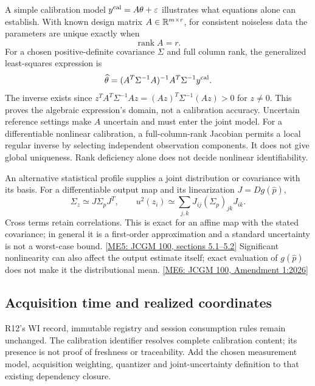 A simple calibration model $y^{\rm cal}=A\theta+\varepsilon$ illustrates what
equations alone can establish. With known design matrix $A\in\mathbb R^{m\times r}$,
for consistent noiseless data the parameters are unique exactly when
\begin{equation}
 \operatorname{rank}A=r.
 \label{r13-measurement-rank}
\end{equation}
For a chosen positive-definite covariance $\Sigma$ and full column rank,
the generalized least-squares expression is
\begin{equation}
 \widehat\theta=(A^T\Sigma^{-1}A)^{-1}A^T\Sigma^{-1}y^{\rm cal}.
 \label{r13-measurement-gls}
\end{equation}
The inverse exists since
$z^TA^T\Sigma^{-1}Az=(Az)^T\Sigma^{-1}(Az)>0$ for $z\ne0$.
This proves the algebraic expression's domain, not a calibration accuracy.
Uncertain reference settings make $A$ uncertain and must enter the joint
model. For a differentiable nonlinear calibration, a full-column-rank
Jacobian permits a local regular inverse by selecting independent observation
components. It does not give global uniqueness. Rank deficiency alone does
not decide nonlinear identifiability.

An alternative statistical profile supplies a joint distribution or covariance
with its basis. For a differentiable output map and its linearization
$J=Dg(\widehat p)$,
\begin{equation}
 \Sigma_z\simeq J\Sigma_pJ^T,\qquad
 u^2(z_i)\simeq\sum_{j,k}J_{ij}(\Sigma_p)_{jk}J_{ik}.
 \label{r13-measurement-covariance}
\end{equation}
Cross terms retain correlations. This is exact for an affine map with the
stated covariance; in general it is a first-order approximation and a
standard uncertainty is not a worst-case bound.
\href{https://doi.org/10.59161/JCGM100-2008E}{[ME5: JCGM 100, sections 5.1--5.2]}
Significant nonlinearity can also affect the output estimate itself;
exact evaluation of $g(\widehat p)$ does not make it the distributional mean.
\href{https://doi.org/10.59161/PPDI3267}{[ME6: JCGM 100, Amendment 1:2026]}

\subsection{Acquisition time and realized coordinates}
\label{r13-measurement-time}

R12's WI record, immutable registry and session consumption rules remain
unchanged. The calibration identifier resolves complete calibration content;
its presence is not proof of freshness or traceability. Add the chosen
measurement model, acquisition weighting, quantizer and joint-uncertainty
definition to that existing dependency closure.

